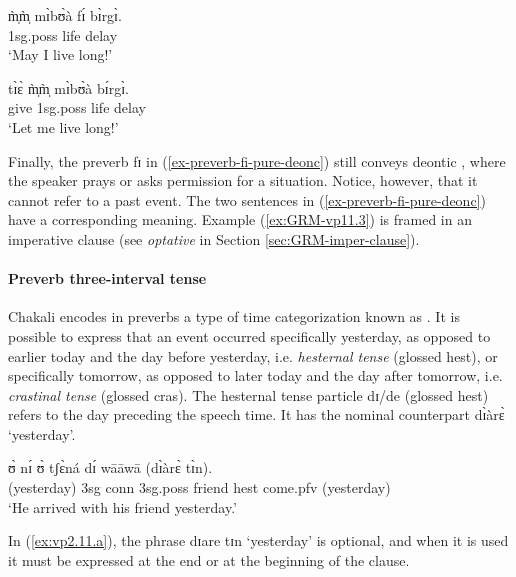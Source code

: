 \begin{exe}
\begin{exe}
\begin{exe}
\begin{exe}
\begin{exe}
\begin{exe}
\begin{exe}
\begin{exe}
\begin{exe}
\begin{exe}
\begin{exe}
\begin{exe}
\ea\label{ex-preverb-fi-pure-deonc}

\ea\label{ex:GRM-vp11.2}
\gll m̩̀m̩̀ mɪ̀bʊ̀à fɪ́  bɪ̀rgɪ̀.\\
 {\sc 1sg.poss} life {\mod}  delay\\
\glt  `May I live long!' 

\ex\label{ex:GRM-vp11.3}
\gll tɪ̀ɛ̀ m̩̀m̩̀ mɪ̀bʊ̀à bɪ́rgɪ̀.\\
   give {\sc 1sg.poss} life delay\\
\glt  `Let me live long!' 

\z 
 \z 


Finally, the preverb {\sls fɪ}  in (\ref{ex-preverb-fi-pure-deonc}) still conveys deontic , where the speaker prays or asks permission for a situation. Notice, however,  that it cannot refer to a past event. The two sentences in (\ref{ex-preverb-fi-pure-deonc}) have a corresponding meaning. Example (\ref{ex:GRM-vp11.3}) is framed in an imperative clause (see  {\it optative} in Section \ref{sec:GRM-imper-clause}). 


\paragraph{Preverb three-interval tense}
\label{sec:GRM-preverb-three-int-tense}

Chakali encodes  in  preverbs  a type of time categorization  known as   \citep[366]{Fraw92}.   It is possible to express that an event occurred specifically yesterday, as opposed to earlier today and the day before yesterday, i.e. {\it hesternal tense} (glossed {\sc hest}), or specifically tomorrow, as opposed to later today and the day after tomorrow, i.e. {\it crastinal tense}  (glossed  {\sc cras}). The hesternal tense particle {\sls dɪ}/{\sls de} (glossed {\sc hest})  refers to the day preceding the speech time.  It has the  nominal  counterpart  {\sls dɪ̀àrɛ̀} `yesterday'.  

\ea\label{ex:vp2.11.a} 
 ʊ̀ nɪ́ ʊ̀ tʃɛ̀ná dɪ́ wāāwā  {(dɪ̀àrɛ̀ tɪ̀n)}.\\
{(yesterday)} {\sc 3sg} {\sc conn} {\sc 3sg.poss} friend
{\sc hest}  come.{\sc pfv} {(yesterday)}\\
\glt  `He arrived with his friend yesterday.'
 \z



In (\ref{ex:vp2.11.a}),  the  phrase {\sls dɪare 
tɪn} `yesterday' is optional,  and  when it is used it must be expressed at the 
end or at the beginning of the clause.



\end{exe}
\end{exe}
\end{exe}
\end{exe}
\end{exe}
\end{exe}
\end{exe}
\end{exe}
\end{exe}
\end{exe}
\end{exe}
\end{exe}
